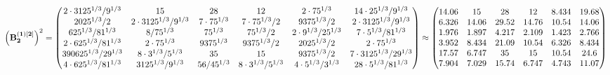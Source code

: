 \documentclass[10pt,a4paper]{article}
\begin{document}
	\[
		\left(\bold{B_2^{(1)[2]}}\right)^{2} = 
		\begin{pmatrix}
			{{2} \cdot {3125^ {1 / 3}}} / {{9^ {1 / 3}}} & {{15}}{} & {{28}}{} & {{12}}{} & {{2} \cdot {75^ {1 / 3}}}{} & {{14} \cdot {25^ {1 / 3}}} / {{9^ {1 / 3}}} \\
			{{2025^ {1 / 3}}} / {{2}} & {{2} \cdot {3125^ {1 / 3}}} / {{9^ {1 / 3}}} & {{7} \cdot {75^ {1 / 3}}}{} & {{7} \cdot {75^ {1 / 3}}} / {{2}} & {{9375^ {1 / 3}}} / {{2}} & {{2} \cdot {3125^ {1 / 3}}} / {{9^ {1 / 3}}} \\
			{{625^ {1 / 3}}} / {{81^ {1 / 3}}} & {{8}} / {{75^ {1 / 3}}} & {{75^ {1 / 3}}}{} & {{75^ {1 / 3}}} / {{2}} & {{2} \cdot {9^ {1 / 3}}} / {{25^ {1 / 3}}} & {{7} \cdot {5^ {1 / 3}}} / {{81^ {1 / 3}}} \\
			{{2} \cdot {625^ {1 / 3}}} / {{81^ {1 / 3}}} & {{2} \cdot {75^ {1 / 3}}}{} & {{9375^ {1 / 3}}}{} & {{9375^ {1 / 3}}} / {{2}} & {{2025^ {1 / 3}}} / {{2}} & {{2} \cdot {75^ {1 / 3}}}{} \\
			{{390625^ {1 / 3}}} / {{2}{9^ {1 / 3}}} & {{8} \cdot {3^ {1 / 3}}} / {{5^ {1 / 3}}} & {{35}}{} & {{15}}{} & {{9375^ {1 / 3}}} / {{2}} & {{7} \cdot {3125^ {1 / 3}}} / {{2}{9^ {1 / 3}}} \\
			{{4} \cdot {625^ {1 / 3}}} / {{81^ {1 / 3}}} & {{3125^ {1 / 3}}} / {{9^ {1 / 3}}} & {{56}} / {{45^ {1 / 3}}} & {{8} \cdot {3^ {1 / 3}}} / {{5^ {1 / 3}}} & {{4} \cdot {5^ {1 / 3}}} / {{3^ {1 / 3}}} & {{28} \cdot {5^ {1 / 3}}} / {{81^ {1 / 3}}} \\
		\end{pmatrix}
		\approx
		\begin{pmatrix}
			14.06    & 15       & 28       & 12       & 8.434    & 19.68    \\
			6.326    & 14.06    & 29.52    & 14.76    & 10.54    & 14.06    \\
			1.976    & 1.897    & 4.217    & 2.109    & 1.423    & 2.766    \\
			3.952    & 8.434    & 21.09    & 10.54    & 6.326    & 8.434    \\
			17.57    & 6.747    & 35       & 15       & 10.54    & 24.6     \\
			7.904    & 7.029    & 15.74    & 6.747    & 4.743    & 11.07    \\
		\end{pmatrix}
	\]
\end{document}
